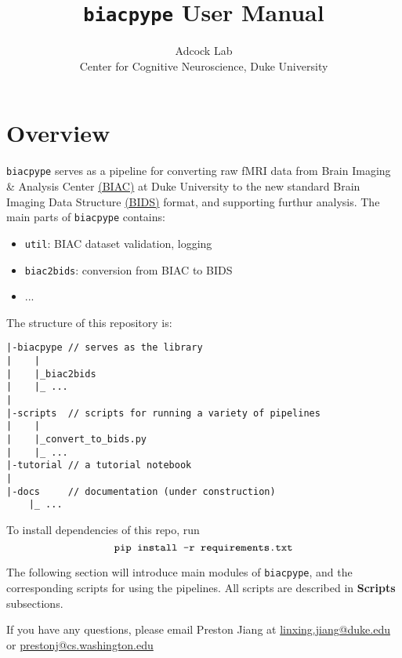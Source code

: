 \documentclass[12pt]{myland}
\def\<#1>{\texttt{#1}}
\begin{document}
\title{\texttt{biacpype} User Manual}
\author{\small{Adcock Lab} \\ \small{Center for Cognitive Neuroscience, Duke University}}
\maketitle
\tableofcontents
\newpage

\section{Overview}

    \texttt{biacpype} serves as a pipeline for converting raw fMRI data from Brain Imaging \& Analysis Center
    \href{https://www.biac.duke.edu/}{(BIAC)} at Duke University to the new standard Brain Imaging Data Structure
    \href{http://bids.neuroimaging.io/}{(BIDS)} format, and supporting furthur analysis. The main parts of
    \texttt{biacpype} contains:

    \begin{itemize}
        \item \texttt{util}: BIAC dataset validation, logging 
        \item \texttt{biac2bids}: conversion from BIAC to BIDS
        \item ...
    \end{itemize}

    The structure of this repository is: \par \vspace{.2in}

    \begin{lstlisting}
|-biacpype // serves as the library
|    |
|    |_biac2bids
|    |_ ...
|
|-scripts  // scripts for running a variety of pipelines
|    |
|    |_convert_to_bids.py
|    |_ ...
|-tutorial // a tutorial notebook
|
|-docs     // documentation (under construction)
    |_ ...
    \end{lstlisting}

    To install dependencies of this repo, run
    \[\text{\<pip install -r requirements.txt>}\]

    The following section will introduce main modules of \texttt{biacpype}, and the corresponding scripts for using
    the pipelines. All scripts are described in \textbf{Scripts} subsections. \par

    If you have any questions, please email Preston Jiang at 
    \href{mailto:linxing.jiang@duke.edu}{linxing.jiang@duke.edu}
    or \href{mailto:prestonj@cs.washington.edu}{prestonj@cs.washington.edu}  \par
\end{document}
